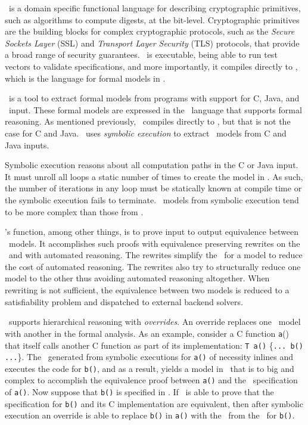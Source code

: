 \cryptol\ is a domain specific functional language for describing cryptographic primitives, such as algorithms to compute digests, at the bit-level.
Cryptographic primitives are the building blocks for complex cryptographic protocols, such as the \emph{Secure Sockets Layer} (SSL) and \emph{Transport Layer Security} (TLS) protocols, that provide a broad range of security guarantees.
\cryptol\ is executable, being able to run test vectors to validate specifications, and more importantly, it compiles directly to \sawcore, which is the language for formal models in \saw.

\saw\ is a tool to extract formal models from programs with support for C, Java, and \cryptol\ input.
These formal models are expressed in the \sawcore\ language that supports formal reasoning.
As mentioned previously, \cryptol\ compiles directly to \sawcore, but that is not the case for C and Java.
\saw\ uses \emph{symbolic execution} to extract \sawcore\ models from C and Java inputs.

Symbolic execution reasons about all computation paths in the C or Java input.
It must unroll all loops a static number of times to create the model in \sawcore.
As such, the number of iterations in any loop must be statically known at compile time or the symbolic execution fails to terminate.
\sawcore\ models from symbolic execution tend to be more complex than those from \cryptol.

\saw's function, among other things, is to prove input to output equivalence between \sawcore\ models.
It accomplishes such proofs with equivalence preserving rewrites on the \sawcore\ and with automated reasoning.
The rewrites simplify the \sawcore\ for a model to reduce the cost of automated reasoning. 
The rewrites also try to structurally reduce one model to the other thus avoiding automated reasoning altogether.
When rewriting is not sufficient, the equivalence between two models is reduced to a satisfiability problem and dispatched to external backend solvers.

\saw\ supports hierarchical reasoning with \emph{overrides}.
An override replaces one \sawcore\ model with another in the formal analysis.
As an example, consider a C function \texttt{a}() that itself calls another C function as part of its implementation: \texttt{T a()} \{\texttt{... b() ...}\}.
The \sawcore\ generated from symbolic executions for \texttt{a()} of necessity inlines and executes the code for \texttt{b()}, and as a result, yields a model in \sawcore\ that is to big and complex to accomplish the equivalence proof between \texttt{a()} and the \cryptol\ specification of \texttt{a()}.
Now suppose that \texttt{b()} is specified in \cryptol.
If \saw\ is able to prove that the specification for \texttt{b()} and its C implementation are equivalent, then after symbolic execution an override is able to replace \texttt{b()} in \texttt{a()} with the \sawcore\ from the \cryptol\ for \texttt{b()}.

